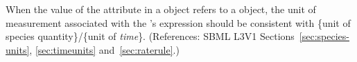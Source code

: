 When the value of the attribute  in a \RateRule object
refers to a \Species object, the unit of measurement associated with the
\RateRule's  expression should be consistent with \{unit of
species quantity\}/\{unit of \emph{time}\}.  (References: SBML L3V1
Sections~\ref{sec:species-units}, \ref{sec:timeunits}
and~\ref{sec:raterule}.)
